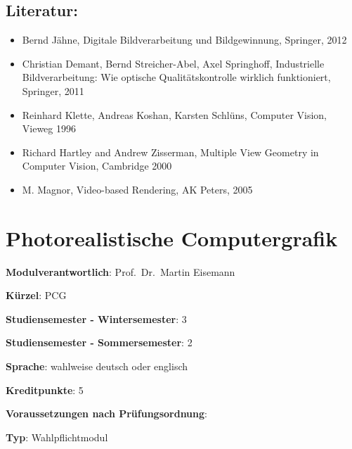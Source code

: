 \section*{Literatur:}\label{literatur-15}

\begin{itemize}
\tightlist
\item
  Bernd Jähne, Digitale Bildverarbeitung und Bildgewinnung, Springer,
  2012
\item
  Christian Demant, Bernd Streicher-Abel, Axel Springhoff, Industrielle
  Bildverarbeitung: Wie optische Qualitätskontrolle wirklich
  funktioniert, Springer, 2011
\item
  Reinhard Klette, Andreas Koshan, Karsten Schlüns, Computer Vision,
  Vieweg 1996
\item
  Richard Hartley and Andrew Zisserman, Multiple View Geometry in
  Computer Vision, Cambridge 2000
\item
  M. Magnor, Video-based Rendering, AK Peters, 2005
\end{itemize}

\chapter{Photorealistische
Computergrafik}\label{photorealistische-computergrafik}

\begin{modulHead}
\textbf{Modulverantwortlich}: Prof.~Dr.~Martin
Eisemann
\end{modulHead}
\begin{modulHead}
\textbf{Kürzel}:
PCG
\end{modulHead}
\begin{modulHead}
\textbf{Studiensemester -
Wintersemester}:
3
\end{modulHead}
\begin{modulHead}
\textbf{Studiensemester -
Sommersemester}: 2
\end{modulHead}
\begin{modulHead}
\textbf{Sprache}:
wahlweise deutsch oder
englisch
\end{modulHead}
\begin{modulHead}
\textbf{Kreditpunkte}:
5
\end{modulHead}
\begin{modulHead}
\textbf{Voraussetzungen nach
Prüfungsordnung}: ~
\end{modulHead}
\begin{modulHead}
\textbf{Typ}:
Wahlpflichtmodul
\end{modulHead}


